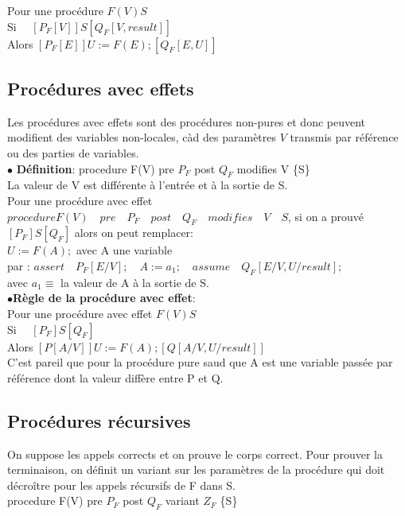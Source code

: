 Pour une procédure $F(V) {S}$\\
Si $\quad  [P_F[V]]S[Q_F[V,result]]$\\
Alors $[P_F[E]]U:=F(E);[Q_F[E,U]]$\\
\subsection{Procédures avec effets}
Les procédures avec effets sont des procédures non-pures et donc peuvent modifient des variables non-locales, càd des paramètres $V$ transmis par référence ou des parties de variables.\\

$\bullet$ \textbf{Définition}: procedure F(V) pre $P_F$ post $Q_F$ modifies V \{S\}\\
La valeur de V est différente à l'entrée et à la sortie de S.\\

Pour une procédure avec effet $procedure F(V) \quad pre \quad P_F \quad post \quad Q_F \quad modifies \quad V \quad {S}$, si on a prouvé $[P_F] S [Q_F]$ alors on peut remplacer:\\
$U:=F(A);$ avec A une variable\\
par : $assert \quad P_F[E/V]; \quad A:= a_1; \quad assume \quad Q_F[E/V,U/result];$\\
avec $a_1 \equiv$ la valeur de A à la sortie de S.\\

$\bullet$\textbf{Règle de la procédure avec effet}:\\

Pour une procédure avec effet $F(V) {S}$\\
Si $\quad  [P_F]S[Q_F]$\\
Alors $[P[A/V]]U:=F(A);[Q[A/V,U/result]]$\\
C'est pareil que pour la procédure pure saud que A est une variable passée par référence dont la valeur diffère entre P et Q. \vfill

\subsection{Procédures récursives}
On suppose les appels corrects et on prouve le corps correct.
Pour prouver la terminaison, on définit un variant sur les paramètres de la procédure qui doit décroître pour les appels récursifs de F dans S.\\
procedure F(V) pre $P_F$ post $Q_F$ variant $Z_F$ \{S\}\\

